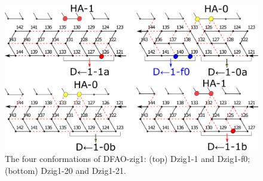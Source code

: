 
\begin{figure}
\vspace*{-5mm}
\centering
\includegraphics[width=\linewidth]{pic/DFAO-zig1.png}  
\caption{The four conformations of DFAO-zig1: (top) Dzig1-1 and Dzig1-f0; (bottom) Dzig1-20 and Dzig1-21.}
\label{fig:DFAO-zig1}
\vspace*{-3mm}
\end{figure}

